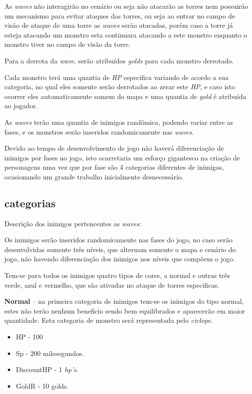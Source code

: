 \documentclass[11pt]{article} %
\begin{document}
As \textit{waves} não interagirão no cenário ou seja não atacarão as torres nem possuirão um mecanismo para evitar ataques das torres, ou seja ao entrar no campo de visão de ataque de uma torre as \textit{waves} serão atacadas, porém caso a torre já esteja atacando um monstro esta continuara atacando a este monstro enquanto o monstro tiver no campo de visão da torre.

Para a derrota da \textit{wave}, serão atribuídos \textit{golds} para cada monstro derrotado. 

Cada monstro terá uma quantia de \textit{HP} especifica variando de acordo a sua categoria, no qual eles somente serão derrotados ao zerar este \textit{HP}, e caso isto ocorrer eles automaticamente somem do mapa e uma quantia de \textit{gold} é atribuída ao jogador.

As \textit{waves} terão uma quantia de inimigos randômica, podendo variar entre as fases, e os monstros serão inseridos randomicamente nas \textit{waves}.

Devido ao tempo de desenvolvimento de jogo não haverá diferenciação de inimigos por fases no jogo, isto acarretaria um esforço gigantesco na criação de personagens uma vez que por fase são 4 categorias diferentes de inimigos, ocasionando um grande trabalho inicialmente desnecessário. 

\subsection{categorias}
Descrição dos inimigos pertencentes as \textit{waves}:

Os inimigos serão inseridos randomicamente nas fases do jogo, no caso serão desenvolvidas somente três níveis, que alternam somente o mapa e cenário do jogo, não havendo diferenciação dos inimigos nos níveis que compõem o jogo.

Tem-se para todos os inimigos quatro tipos de cores, a normal e outras três verde, azul e vermelho, que são ativadas no ataque de torres especificas. 

\textbf{{\large Normal}} – na primeira categoria de inimigos tem-se os inimigos do tipo normal, estes não terão nenhum beneficio sendo bem equilibrados e aparecerão em maior quantidade. Esta categoria de monstro será representada pelo \textit{ciclope}.
\begin{itemize}
\item HP - 100
\item Sp - 200 milesegundos.
\item DiscountHP - 1 \textit{hp's}.
\item GoldR - 10 golds.
\end{itemize}
\end{document}
